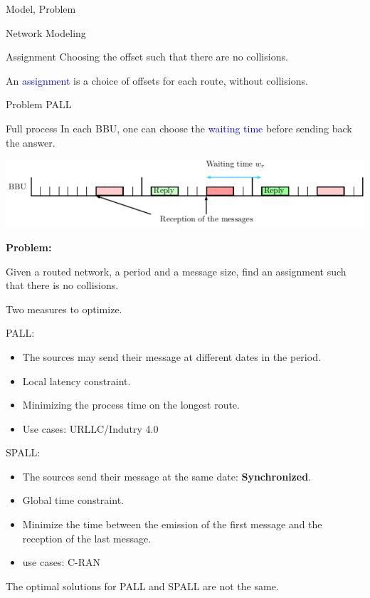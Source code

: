 \documentclass[10 pt]{beamer}
\begin{document}
\begin{section}{Model, Problem}
\begin{subsection}{Network Modeling}
\begin{frame}{Assignment }
\vspace{1cm}
\centering
Choosing the offset such that there are no collisions.
\vspace{0.5cm}
\pause

An \textcolor{blue}{assignment} is a choice of offsets for each route, without collisions.
\end{frame}
\end{subsection}



\begin{subsection}{Problem PALL}
\begin{frame}{Full process}
In each BBU, one can choose the \textcolor{blue}{waiting time} before sending back the answer.\\

\begin{center}
  \includegraphics[scale=0.7]{BBU}\\
 \end{center} 

\textbf{Problem:}

Given a routed network, a period and a message size, find an assignment such that there is no collisions.
\end {frame}
\begin{frame}
Two measures to optimize.
 \begin{multicols}{2}
PALL:
\begin{itemize}
\item The sources may send their message at different dates in the period.
\item Local latency constraint.
\item Minimizing the process time on the longest route.
\item Use cases: URLLC/Indutry 4.0
\end{itemize}
\vspace{0.5cm}
SPALL:
\begin{itemize}
\item The sources send their message at the same date: \textbf{Synchronized}.
\item Global time constraint.
\item Minimize the time between the emission of the first message and the reception of the last message.
\item use cases: C-RAN
\end{itemize}
\end{multicols}

The optimal solutions for PALL and SPALL are not the same.
\end{frame}
\end{subsection}


\end{section}
\end{document}
